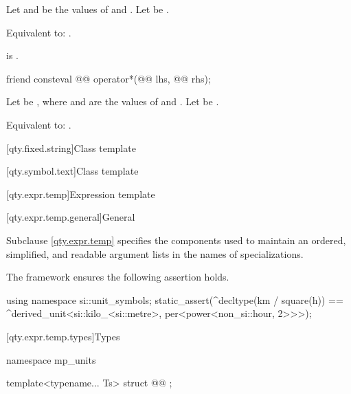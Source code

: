 \begin{itemdescr}
\pnum
Let  and  be the values of  and .
Let  be .

\pnum
\effects
Equivalent to: .

\pnum
\ensures
{} is .
\end{itemdescr}

\begin{itemdecl}
friend consteval @@ operator*(@@ lhs, @@ rhs);
\end{itemdecl}

\begin{itemdescr}
\pnum
Let  be ,
where  and  are the values of  and .
Let  be .

\pnum
\effects
Equivalent to: .
\end{itemdescr}

[qty.fixed.string]{Class template }

[qty.symbol.text]{Class template }

[qty.expr.temp]{Expression template}

[qty.expr.temp.general]{General}

\pnum
Subclause \ref{qty.expr.temp} specifies the components
used to maintain an ordered, simplified, and readable
argument lists in the names of specializations.
\begin{example}
The framework ensures the following assertion holds.
\begin{codeblock}
using namespace si::unit_symbols;
static_assert(^decltype(km / square(h)) ==
              ^derived_unit<si::kilo_<si::metre>, per<power<non_si::hour, 2>>>);
\end{codeblock}
\end{example}

[qty.expr.temp.types]{Types}

\begin{codeblock}
namespace mp_units {

template<typename... Ts>
struct @@ {};

}
\end{codeblock}

